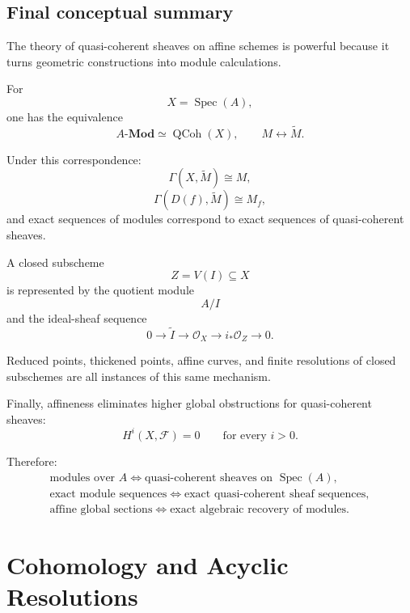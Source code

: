 \documentclass[12pt,a4paper]{article}
\theoremstyle{notespace}
\begin{document}
\subsection{Final conceptual summary}

The theory of quasi-coherent sheaves on affine schemes is powerful because it
turns geometric constructions into module calculations.

For
\[
X=\operatorname{Spec}(A),
\]
one has the equivalence
\[
A\text{-}\mathbf{Mod}
\simeq
\operatorname{QCoh}(X),
\qquad
M\longleftrightarrow \widetilde{M}.
\]

Under this correspondence:
\[
\Gamma(X,\widetilde{M})\cong M,
\]
\[
\Gamma(D(f),\widetilde{M})\cong M_{f},
\]
and exact sequences of modules correspond to exact sequences of
quasi-coherent sheaves.

A closed subscheme
\[
Z=V(I)\subseteq X
\]
is represented by the quotient module
\[
A/I
\]
and the ideal-sheaf sequence
\[
0
\longrightarrow
\widetilde{I}
\longrightarrow
\mathcal{O}_{X}
\longrightarrow
i_{*}\mathcal{O}_{Z}
\longrightarrow
0.
\]

Reduced points, thickened points, affine curves, and finite resolutions of
closed subschemes are all instances of this same mechanism.

Finally, affineness eliminates higher global obstructions for quasi-coherent
sheaves:
\[
H^{i}(X,\mathcal{F})=0
\qquad
\text{for every }i>0.
\]

Therefore:
\[
\boxed{
	\begin{array}{c}
		\text{modules over }A
		\Longleftrightarrow
		\text{quasi-coherent sheaves on }\operatorname{Spec}(A),
		\\[6pt]
		\text{exact module sequences}
		\Longleftrightarrow
		\text{exact quasi-coherent sheaf sequences},
		\\[6pt]
		\text{affine global sections}
		\Longleftrightarrow
		\text{exact algebraic recovery of modules}.
	\end{array}
}
\]



\section{Cohomology and Acyclic Resolutions}
\label{sec:cohomology-acyclic-resolutions}
\end{document}
